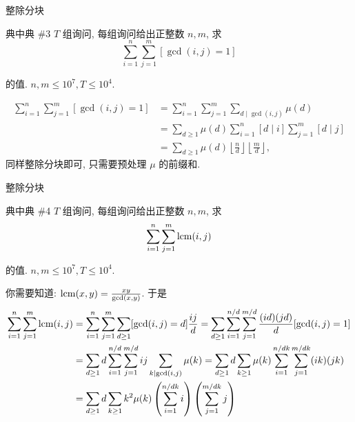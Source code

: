 \documentclass{beamer}
\begin{document}
    \begin{frame}{整除分块}
        \begin{block}{典中典 \#3}
            $T$ 组询问, 每组询问给出正整数 $n,m$, 求
            $$
            \sum_{i=1}^n\sum_{j=1}^m[\gcd(i,j)=1]
            $$

            的值. $n,m\leq 10^7,T\leq 10^4$.
        \end{block}
        \pause
        \begin{align*}
            \sum_{i=1}^n\sum_{j=1}^m[\gcd(i,j)=1]&=\sum_{i=1}^n\sum_{j=1}^m\sum_{d\mid\gcd(i,j)}\mu(d)\\
            &=\sum_{d\geq 1}\mu(d)\sum_{i=1}^n[d\mid i]\sum_{j=1}^m[d\mid j]\\
            &=\sum_{d\geq 1}\mu(d)\left\lfloor\frac nd\right\rfloor\left\lfloor\frac md\right\rfloor,
        \end{align*}
        同样整除分块即可, 只需要预处理 $\mu$ 的前缀和.
    \end{frame}

    \begin{frame}{整除分块}
        \begin{block}{典中典 \#4}
            $T$ 组询问, 每组询问给出正整数 $n,m$, 求
            $$
            \sum_{i=1}^n\sum_{j=1}^m{\rm lcm}(i,j)
            $$

            的值. $n,m\leq 10^7,T\leq 10^4$.
        \end{block}
        \pause
        你需要知道: ${\rm lcm}(x,y)={xy\over\gcd(x,y)}$. 于是
        \begin{align*}
            \sum_{i=1}^n\sum_{j=1}^m{\rm lcm}(i,j)&=\sum_{i=1}^n\sum_{j=1}^m\sum_{d\geq 1}[\gcd(i,j)=d]{ij\over d}=\sum_{d\geq 1}\sum_{i=1}^{n/d}\sum_{j=1}^{m/d}{(id)(jd)\over d}[\gcd(i,j)=1]\\
            &=\sum_{d\geq 1}d\sum_{i=1}^{n/d}\sum_{j=1}^{m/d}ij\sum_{k\mid\gcd(i,j)}\mu(k)=\sum_{d\geq 1}d\sum_{k\geq 1}\mu(k)\sum_{i=1}^{n/dk}\sum_{j=1}^{m/dk}(ik)(jk)\\
            &=\sum_{d\geq 1}d\sum_{k\geq 1}k^2\mu(k)\left(\sum_{i=1}^{n/dk}i\right)\left(\sum_{j=1}^{m/dk}j\right)\\
        \end{align*}
    \end{frame}
\end{document}
